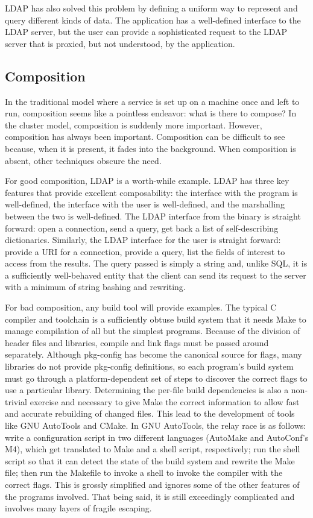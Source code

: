 \documentclass[letterpaper,twocolumn,10pt]{article}
\begin{document}
LDAP has also solved this problem by defining a uniform way to represent and query different kinds of data. The application has a well-defined interface to the LDAP server, but the user can provide a sophisticated request to the LDAP server that is proxied, but not understood, by the application.

\subsection{Composition}
In the traditional model where a service is set up on a machine once and left to run, composition seems like a pointless endeavor: what is there to compose? In the cluster model, composition is suddenly more important. However, composition has always been important. Composition can be difficult to see because, when it is present, it fades into the background. When composition is absent, other techniques obscure the need.

For good composition, LDAP is a worth-while example. LDAP has three key features that provide excellent composability: the interface with the program is well-defined, the interface with the user is well-defined, and the marshalling between the two is well-defined. The LDAP interface from the binary is straight forward: open a connection, send a query, get back a list of self-describing dictionaries. Similarly, the LDAP interface for the user is straight forward: provide a URI for a connection, provide a query, list the fields of interest to access from the results. The query passed is simply a string and, unlike SQL, it is a sufficiently well-behaved entity that the client can send its request to the server with a minimum of string bashing and rewriting.

For bad composition, any build tool will provide examples. The typical C compiler and toolchain is a sufficiently obtuse build system that it needs Make to manage compilation of all but the simplest programs. Because of the division of header files and libraries, compile and link flags must be passed around separately. Although pkg-config has become the canonical source for flags, many libraries do not provide pkg-config definitions, so each program's build system must go through a platform-dependent set of steps to discover the correct flags to use a particular library. Determining the per-file build dependencies is also a non-trivial exercise and necessary to give Make the correct information to allow fast and accurate rebuilding of changed files. This lead to the development of tools like GNU AutoTools and CMake. In GNU AutoTools, the relay race is as follows: write a configuration script in two different languages (AutoMake and AutoConf's M4), which get translated to Make and a shell script, respectively; run the shell script so that it can detect the state of the build system and rewrite the Make file; then run the Makefile to invoke a shell to invoke the compiler with the correct flags. This is grossly simplified and ignores some of the other features of the programs involved. That being said, it is still exceedingly complicated and involves many layers of fragile escaping.
\end{document}
